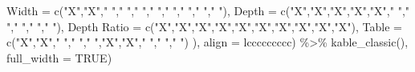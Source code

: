 \documentclass[
]{article}
\newenvironment{Shaded}{\begin{snugshade}}{\end{snugshade}}
\newcommand{\AttributeTok}[1]{\textcolor[rgb]{0.77,0.63,0.00}{#1}}
\newcommand{\ConstantTok}[1]{\textcolor[rgb]{0.00,0.00,0.00}{#1}}
\newcommand{\FunctionTok}[1]{\textcolor[rgb]{0.00,0.00,0.00}{#1}}
\newcommand{\NormalTok}[1]{#1}
\newcommand{\OtherTok}[1]{\textcolor[rgb]{0.56,0.35,0.01}{#1}}
\newcommand{\SpecialCharTok}[1]{\textcolor[rgb]{0.00,0.00,0.00}{#1}}
\newcommand{\StringTok}[1]{\textcolor[rgb]{0.31,0.60,0.02}{#1}}
\begin{document}
\begin{Shaded}
\begin{Highlighting}[]
             \AttributeTok{Width         =} \FunctionTok{c}\NormalTok{(}\StringTok{"X"}\NormalTok{,}\StringTok{"X"}\NormalTok{,}\StringTok{" "}\NormalTok{,}\StringTok{" "}\NormalTok{,}\StringTok{" "}\NormalTok{,}\StringTok{" "}\NormalTok{,}\StringTok{" "}\NormalTok{,}\StringTok{" "}\NormalTok{,}\StringTok{" "}\NormalTok{,}\StringTok{" "}\NormalTok{),}
             \AttributeTok{Depth         =} \FunctionTok{c}\NormalTok{(}\StringTok{"X"}\NormalTok{,}\StringTok{"X"}\NormalTok{,}\StringTok{"X"}\NormalTok{,}\StringTok{"X"}\NormalTok{,}\StringTok{"X"}\NormalTok{,}\StringTok{" "}\NormalTok{,}\StringTok{" "}\NormalTok{,}\StringTok{" "}\NormalTok{,}\StringTok{" "}\NormalTok{,}\StringTok{" "}\NormalTok{),}
             \StringTok{\textasciigrave{}}\AttributeTok{Depth Ratio}\StringTok{\textasciigrave{}} \OtherTok{=} \FunctionTok{c}\NormalTok{(}\StringTok{"X"}\NormalTok{,}\StringTok{"X"}\NormalTok{,}\StringTok{"X"}\NormalTok{,}\StringTok{"X"}\NormalTok{,}\StringTok{"X"}\NormalTok{,}\StringTok{"X"}\NormalTok{,}\StringTok{"X"}\NormalTok{,}\StringTok{"X"}\NormalTok{,}\StringTok{"X"}\NormalTok{,}\StringTok{"X"}\NormalTok{),}
             \AttributeTok{Table         =} \FunctionTok{c}\NormalTok{(}\StringTok{"X"}\NormalTok{,}\StringTok{"X"}\NormalTok{,}\StringTok{" "}\NormalTok{,}\StringTok{" "}\NormalTok{,}\StringTok{" "}\NormalTok{,}\StringTok{"X"}\NormalTok{,}\StringTok{"X"}\NormalTok{,}\StringTok{" "}\NormalTok{,}\StringTok{" "}\NormalTok{,}\StringTok{" "}\NormalTok{)}
\NormalTok{             ),}
  \AttributeTok{align =} \StringTok{\textquotesingle{}lccccccccc\textquotesingle{}}\NormalTok{) }\SpecialCharTok{\%\textgreater{}\%} \FunctionTok{kable\_classic}\NormalTok{(),}
  \AttributeTok{full\_width =} \ConstantTok{TRUE}\NormalTok{)}
\end{Highlighting}
\end{Shaded}
\end{document}
